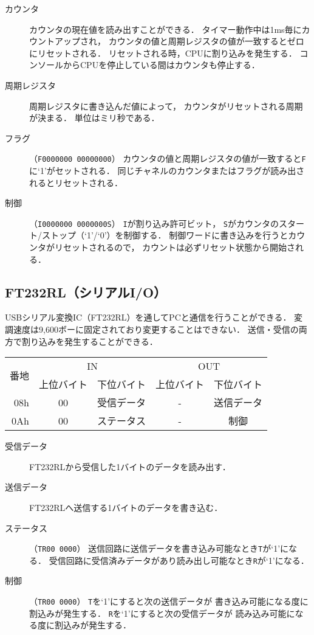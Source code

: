 \begin{description}
\item[カウンタ]
  カウンタの現在値を読み出すことができる．
  タイマー動作中は1ms毎にカウントアップされ，
  カウンタの値と周期レジスタの値が一致するとゼロにリセットされる．
  リセットされる時，CPUに割り込みを発生する．
  コンソールからCPUを停止している間はカウンタも停止する．
\item[周期レジスタ]
  周期レジスタに書き込んだ値によって，
  カウンタがリセットされる周期が決まる．
  単位はミリ秒である．
\item[フラグ]（\texttt{F0000000 00000000}）
  カウンタの値と周期レジスタの値が一致すると\texttt{F}に`1'がセットされる．
  同じチャネルのカウンタまたはフラグが読み出されるとリセットされる．
\item[制御]（\texttt{I0000000 0000000S}）
  \texttt{I}が割り込み許可ビット，
  \texttt{S}がカウンタのスタート/ストップ（`1'/`0'）を制御する．
  制御ワードに書き込みを行うとカウンタがリセットされるので，
  カウントは必ずリセット状態から開始される．
\end{description}

\subsection{FT232RL（シリアルI/O）}
USBシリアル変換IC（FT232RL）を通してPCと通信を行うことができる．
変調速度は9,600ボーに固定されており変更することはできない．
送信・受信の両方で割り込みを発生することができる．

\begin{center}
  \small\begin{tabular}{| r | c | c || c | c |}\hline
    \multirow{2}{*}{番地}
    & \multicolumn{2}{|c||}{IN}
    & \multicolumn{2}{c|}{OUT}
    \\\cline{2-5}
         & 上位バイト & 下位バイト & 上位バイト & 下位バイト
    \\\hline\hline
    08h  &  00 & 受信データ
         &  -  & 送信データ \\\hline
    0Ah  &  00 & ステータス
         &  -  & 制御 \\\hline
  \end{tabular}
\end{center}

\begin{description}
\item[受信データ]
  FT232RLから受信した1バイトのデータを読み出す．
\item[送信データ]
  FT232RLへ送信する1バイトのデータを書き込む．
\item[ステータス]（\texttt{TR00 0000}）
  送信回路に送信データを書き込み可能なとき\texttt{T}が`1'になる．
  受信回路に受信済みデータがあり読み出し可能なとき\texttt{R}が`1'になる．
\item[制御]（\texttt{TR00 0000}）
  \texttt{T}を`1'にすると次の送信データが
  書き込み可能になる度に割込みが発生する．
  \texttt{R}を`1'にすると次の受信データが
  読み込み可能になる度に割込みが発生する．
\end{description}

